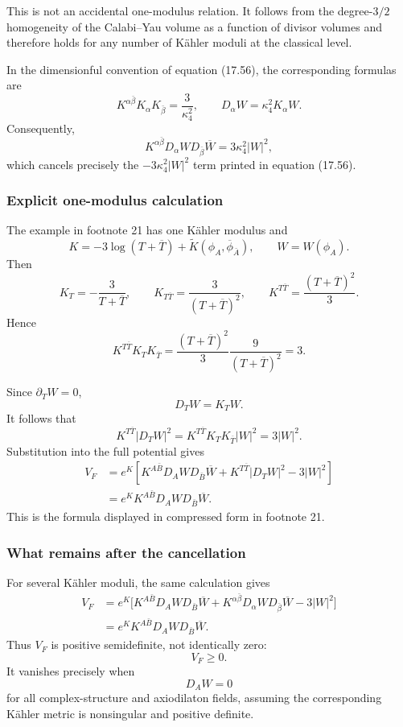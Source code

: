 \documentclass[
  10pt,
  a4paper,
  openany]{book}
\begin{document}
This is not an accidental one-modulus relation. It follows from the
degree-\(3/2\) homogeneity of the Calabi--Yau volume as a function of
divisor volumes and therefore holds for any number of Kähler moduli at
the classical level.

In the dimensionful convention of equation (17.56), the corresponding
formulas are \[
K^{\alpha\bar\beta}K_\alpha K_{\bar\beta}
=\frac{3}{\kappa_4^2},
\qquad
D_\alpha W=\kappa_4^2K_\alpha W.
\] Consequently, \[
K^{\alpha\bar\beta}D_\alpha W
D_{\bar\beta}\overline W
=3\kappa_4^2|W|^2,
\] which cancels precisely the \(-3\kappa_4^2|W|^2\) term printed in
equation (17.56).

\subsubsection{Explicit one-modulus
calculation}\label{explicit-one-modulus-calculation}

The example in footnote 21 has one Kähler modulus and \[
K
=-3\log(T+\overline T)
+\widetilde K(\phi_A,\overline\phi_{\bar A}),
\qquad
W=W(\phi_A).
\] Then \[
K_T=-\frac{3}{T+\overline T},
\qquad
K_{T\overline T}
=\frac{3}{(T+\overline T)^2},
\qquad
K^{T\overline T}
=\frac{(T+\overline T)^2}{3}.
\] Hence \[
K^{T\overline T}K_TK_{\overline T}
=\frac{(T+\overline T)^2}{3}
\frac{9}{(T+\overline T)^2}
=3.
\]

Since \(\partial_TW=0\), \[
D_TW=K_TW.
\] It follows that \[
K^{T\overline T}|D_TW|^2
=K^{T\overline T}K_TK_{\overline T}|W|^2
=3|W|^2.
\] Substitution into the full potential gives \[
\begin{aligned}
V_F
&=e^K\left[
K^{A\bar B}D_AW D_{\bar B}\overline W
+K^{T\overline T}|D_TW|^2
-3|W|^2
\right]\\
&=e^K K^{A\bar B}
D_AW D_{\bar B}\overline W.
\end{aligned}
\] This is the formula displayed in compressed form in footnote 21.

\subsubsection{What remains after the
cancellation}\label{what-remains-after-the-cancellation}

For several Kähler moduli, the same calculation gives \[
\begin{aligned}
V_F
&=e^K\bigl[
K^{A\bar B}D_AW D_{\bar B}\overline W
+K^{\alpha\bar\beta}D_\alpha W
D_{\bar\beta}\overline W
-3|W|^2
\bigr]\\
&=e^K K^{A\bar B}D_AW
D_{\bar B}\overline W.
\end{aligned}
\] Thus \(V_F\) is positive semidefinite, not identically zero: \[
V_F\geq0.
\] It vanishes precisely when \[
D_AW=0
\] for all complex-structure and axiodilaton fields, assuming the
corresponding Kähler metric is nonsingular and positive definite.
\end{document}
